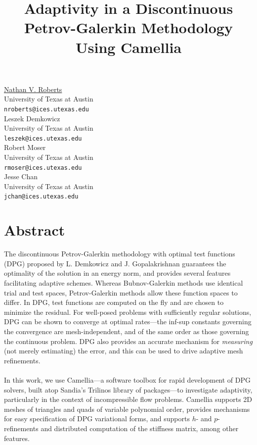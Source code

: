 \documentclass[article, A4, 11pt]{llncs}%
\begin{document}
\title{Adaptivity in a Discontinuous Petrov-Galerkin Methodology Using Camellia}
 \author{} \institute{}
\maketitle
\begin{center}
{\large \underline{Nathan V. Roberts}}\\
University of Texas at Austin\\
{\tt nroberts@ices.utexas.edu}
\\ \vspace{4mm}
{\large Leszek Demkowicz}\\
University of Texas at Austin\\
{\tt leszek@ices.utexas.edu}
\\ \vspace{4mm}
{\large Robert Moser}\\
University of Texas at Austin\\
{\tt rmoser@ices.utexas.edu}
\\ \vspace{4mm}
{\large Jesse Chan}\\
University of Texas at Austin\\
{\tt jchan@ices.utexas.edu}
\end{center}

\section*{Abstract}
The discontinuous Petrov-Galerkin methodology with optimal test functions (DPG) proposed by L. Demkowicz and J. Gopalakrishnan guarantees the optimality of the solution in an energy norm, and provides several features facilitating adaptive schemes.  Whereas Bubnov-Galerkin methods use identical trial and test spaces, Petrov-Galerkin methods allow these function spaces to differ. In DPG, test functions are computed on the fly and are chosen to minimize the residual. For well-posed problems with sufficiently regular solutions, DPG can be shown to converge at optimal rates---the inf-sup constants governing the convergence are mesh-independent, and of the same order as those governing the continuous problem. DPG also provides an accurate mechanism for \emph{measuring} (not merely estimating) the error, and this can be used to drive adaptive mesh refinements.\\
\\
In this work, we use Camellia---a software toolbox for rapid development of DPG solvers, built atop Sandia's Trilinos library of packages---to investigate adaptivity, particularly in the context of incompressible flow problems.  Camellia supports 2D meshes of triangles and quads of variable polynomial order, provides mechanisms for easy specification of DPG variational forms, and supports $h$- and $p$- refinements and distributed computation of the stiffness matrix, among other features.
\end{document}
